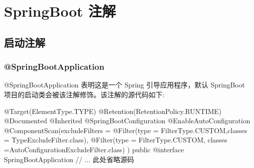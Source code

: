 \section{SpringBoot 注解}
\subsection{启动注解}
\subsubsection{@SpringBootApplication}

@SpringBootApplication 表明这是一个 Spring 引导应用程序，默认 SpringBoot 项目的启动类会被该注解修饰。该注解的源代码如下:

\begin{Java}
@Target(ElementType.TYPE)
@Retention(RetentionPolicy.RUNTIME)
@Documented
@Inherited
@SpringBootConfiguration
@EnableAutoConfiguration
@ComponentScan(excludeFilters = { @Filter(type = FilterType.CUSTOM,classes = TypeExcludeFilter.class),
        @Filter(type = FilterType.CUSTOM, classes =AutoConfigurationExcludeFilter.class) })
public @interface SpringBootApplication {
    // ... 此处省略源码
}
\end{Java}